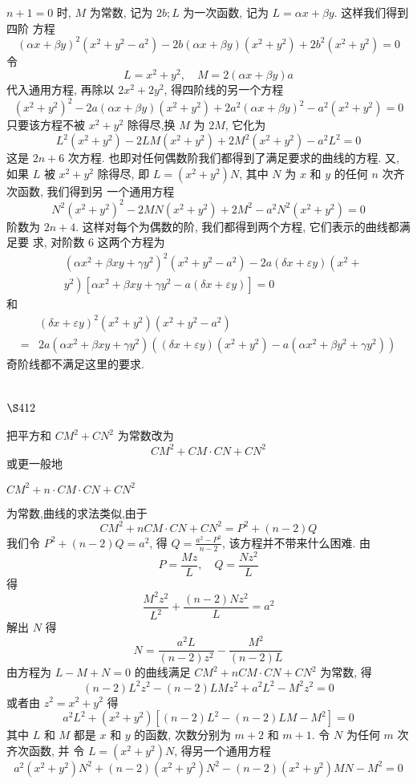 $n+1=0$ 时, $M$ 为常数, 记为 $2 b ; L$ 为一次函数, 记为 $L=\alpha x+\beta y$. 这样我们得到四阶 方程
\[
(\alpha x+\beta y)^{2}\left(x^{2}+y^{2}-a^{2}\right)-2 b(\alpha x+\beta y)\left(x^{2}+y^{2}\right)+2 b^{2}\left(x^{2}+y^{2}\right)=0
\]
令
\[
L=x^{2}+y^{2}, \quad M=2(\alpha x+\beta y) a
\]
代入通用方程, 再除以 $2 x^{2}+2 y^{2}$, 得四阶线的另一个方程
\[
\left(x^{2}+y^{2}\right)^{2}-2 a(\alpha x+\beta y)\left(x^{2}+y^{2}\right)+2 a^{2}(\alpha x+\beta y)^{2}-a^{2}\left(x^{2}+y^{2}\right)=0
\]
只要该方程不被 $x^{2}+y^{2}$ 除得尽,换 $M$ 为 $2 M$, 它化为
\[
L^{2}\left(x^{2}+y^{2}\right)-2 L M\left(x^{2}+y^{2}\right)+2 M^{2}\left(x^{2}+y^{2}\right)-a^{2} L^{2}=0
\]
这是 $2 n+6$ 次方程. 也即对任何偶数阶我们都得到了满足要求的曲线的方程. 又, 如果 $L$ 被 $x^{2}+y^{2}$ 除得尽, 即 $L=\left(x^{2}+y^{2}\right) N$, 其中 $N$ 为 $x$ 和 $y$ 的任何 $n$ 次齐次函数, 我们得到另 一个通用方程
\[
N^{2}\left(x^{2}+y^{2}\right)^{2}-2 M N\left(x^{2}+y^{2}\right)+2 M^{2}-a^{2} N^{2}\left(x^{2}+y^{2}\right)=0
\]
阶数为 $2 n+4$. 这样对每个为偶数的阶, 我们都得到两个方程, 它们表示的曲线都满足要 求, 对阶数 6 这两个方程为
\[
\begin{aligned}
& \left(\alpha x^{2}+\beta x y+\gamma y^{2}\right)^{2}\left(x^{2}+y^{2}-a^{2}\right)-2 a(\delta x+\varepsilon y)\left(x^{2}+\right. \\
& \left.y^{2}\right)\left[\alpha x^{2}+\beta x y+\gamma y^{2}-a(\delta x+\varepsilon y)\right]=0
\end{aligned}
\]
和
\[
\begin{aligned}
& (\delta x+\varepsilon y)^{2}\left(x^{2}+y^{2}\right)\left(x^{2}+y^{2}-a^{2}\right) \\
= & 2 a\left(\alpha x^{2}+\beta x y+\gamma y^{2}\right)\left((\delta x+\varepsilon y)\left(x^{2}+y^{2}\right)-a\left(\alpha x^{2}+\beta y^{2}+\gamma y^{2}\right)\right)
\end{aligned}
\]
奇阶线都不满足这里的要求.

\section{$\S 412$}

把平方和 $C M^{2}+C N^{2}$ 为常数改为
\[
C M^{2}+C M \cdot C N+C N^{2}
\]
或更一般地

 $C M^{2}+n \cdot C M \cdot C N+C N^{2}$

为常数,曲线的求法类似,由于
\[
C M^{2}+n C M \cdot C N+C N^{2}=P^{2}+(n-2) Q
\]
我们令 $P^{2}+(n-2) Q=a^{2}$, 得 $Q=\frac{a^{2}-P^{2}}{n-2}$, 该方程并不带来什么困难. 由
\[
P=\frac{M z}{L}, \quad Q=\frac{N z^{2}}{L}
\]
得
\[
\frac{M^{2} z^{2}}{L^{2}}+\frac{(n-2) N z^{2}}{L}=a^{2}
\]
解出 $N$ 得
\[
N=\frac{a^{2} L}{(n-2) z^{2}}-\frac{M^{2}}{(n-2) L}
\]
由方程为 $L-M+N=0$ 的曲线满足 $C M^{2}+n C M \cdot C N+C N^{2}$ 为常数, 得
\[
(n-2) L^{2} z^{2}-(n-2) L M z^{2}+a^{2} L^{2}-M^{2} z^{2}=0
\]
或者由 $z^{2}=x^{2}+y^{2}$ 得
\[
a^{2} L^{2}+\left(x^{2}+y^{2}\right)\left[(n-2) L^{2}-(n-2) L M-M^{2}\right]=0
\]
其中 $L$ 和 $M$ 都是 $x$ 和 $y$ 的函数, 次数分别为 $m+2$ 和 $m+1$. 令 $N$ 为任何 $m$ 次齐次函数, 并 令 $L=\left(x^{2}+y^{2}\right) N$, 得另一个通用方程
\[
a^{2}\left(x^{2}+y^{2}\right) N^{2}+(n-2)\left(x^{2}+y^{2}\right) N^{2}-(n-2)\left(x^{2}+y^{2}\right) M N-M^{2}=0
\]
